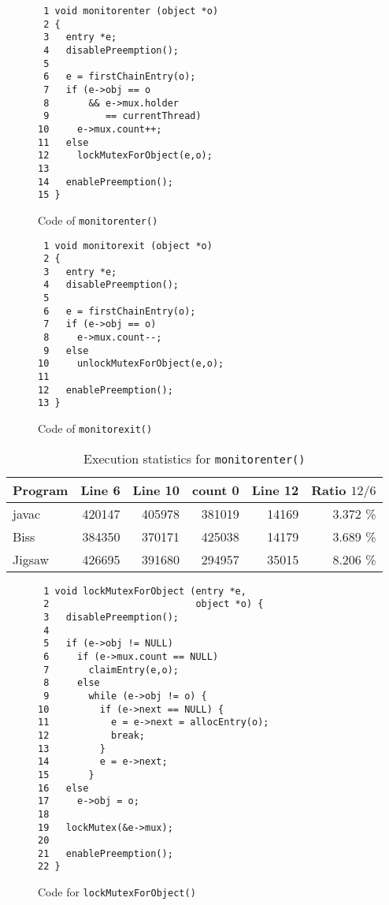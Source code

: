 \begin{figure}
\begin{verbatim}
 1 void monitorenter (object *o)
 2 {
 3   entry *e;
 4   disablePreemption();
 5 
 6   e = firstChainEntry(o);
 7   if (e->obj == o
 8       && e->mux.holder
 9          == currentThread)
10     e->mux.count++;
11   else
12     lockMutexForObject(e,o);
13 
14   enablePreemption();
15 }
\end{verbatim}
\caption{Code of \texttt{monitorenter()}}
\label{monitorenter}
\end{figure}

\begin{figure}
\begin{verbatim}
 1 void monitorexit (object *o)
 2 {
 3   entry *e;
 4   disablePreemption();
 5 
 6   e = firstChainEntry(o);
 7   if (e->obj == o)
 8     e->mux.count--;
 9   else
10     unlockMutexForObject(e,o);
11 
12   enablePreemption();
13 }
\end{verbatim}
\caption{Code of \texttt{monitorexit()}}
\label{monitorexit}
\end{figure}


\begin{table*}
\begin{center}
\begin{tabular}{|l|r|r|r|r|r|}    %
\hline
Program     & Line 6 & Line 10 & count 0 & Line 12 & Ratio $12/6$ \\ \hline\hline
javac       & 420147 & 405978  & 381019  & 14169   & 3.372 \%     \\ \hline
Biss        & 384350 & 370171  & 425038  & 14179   & 3.689 \%     \\ \hline
Jigsaw      & 426695 & 391680  & 294957  & 35015   & 8.206 \%     \\ \hline
\end{tabular}
\caption{Execution statistics for \texttt{monitorenter()}}
\label{monitorEnter}
\end{center}
\end{table*}


\begin{figure}
\begin{verbatim}
 1 void lockMutexForObject (entry *e,
 2                          object *o) {
 3   disablePreemption();
 4 
 5   if (e->obj != NULL)
 6     if (e->mux.count == NULL)
 7       claimEntry(e,o);
 8     else
 9       while (e->obj != o) {
10         if (e->next == NULL) {
11           e = e->next = allocEntry(o);
12           break;
13         }
14         e = e->next;
15       }
16   else
17     e->obj = o;
18 
19   lockMutex(&e->mux);
20 
21   enablePreemption();
22 }
\end{verbatim}
\caption{Code for \texttt{lockMutexForObject()}}
\label{lockMutexForObject}
\end{figure}

